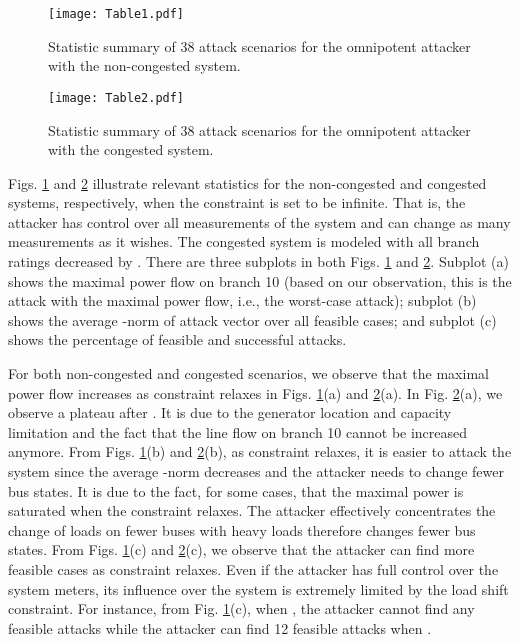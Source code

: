 \documentclass[twocolumn,english,final,journal]{IEEEtran}
\theoremstyle{plain}
\theoremstyle{definition}
\begin{document}
\begin{figure}[tbh]
\texttt{[image: Table1.pdf]}
\caption{Statistic summary of 38 attack scenarios for the omnipotent attacker
with the non-congested system. \label{Fig:table1}}
\end{figure}


\begin{figure}[tbh]
\texttt{[image: Table2.pdf]}
\caption{Statistic summary of 38 attack scenarios for the omnipotent attacker
with the congested system.\label{Fig:table2} }


\end{figure}


Figs. \ref{Fig:table1} and \ref{Fig:table2} illustrate relevant
statistics for the non-congested and congested systems, respectively,
when the  constraint is set to be infinite. That is, the attacker
has control over all measurements of the system and can change as
many measurements as it wishes. The congested system is modeled with
all branch ratings decreased by . There are three subplots
in both Figs. \ref{Fig:table1} and \ref{Fig:table2}. Subplot (a)
shows the maximal power flow on branch 10 (based on our observation,
this is the attack with the maximal power flow, i.e., the worst-case
attack); subplot (b) shows the average -norm of attack vector
 over all feasible cases; and subplot (c) shows the percentage
of feasible and successful attacks. 

For both non-congested and congested scenarios, we observe that the
maximal power flow increases as  constraint relaxes in Figs.
\ref{Fig:table1}(a) and \ref{Fig:table2}(a). In Fig. \ref{Fig:table2}(a),
we observe a plateau after . It is due to the generator
location and capacity limitation and the fact that the line flow on
branch 10 cannot be increased anymore. From Figs. \ref{Fig:table1}(b)
and \ref{Fig:table2}(b), as  constraint relaxes, it is easier
to attack the system since the average -norm decreases and
the attacker needs to change fewer bus states. It is due to the fact, for some cases, that the maximal power is saturated when the  constraint relaxes. The attacker effectively concentrates the change of loads on fewer buses with heavy loads therefore changes fewer bus states. 
 From Figs. \ref{Fig:table1}(c)
and \ref{Fig:table2}(c), we observe that the attacker can find more
feasible cases as  constraint relaxes. Even if the attacker
has full control over the system meters, its influence over the system
is extremely limited by the load shift constraint. For instance, from
Fig. \ref{Fig:table1}(c), when , the attacker cannot
find any feasible attacks while the attacker can find 12 feasible
attacks when .
\end{document}

